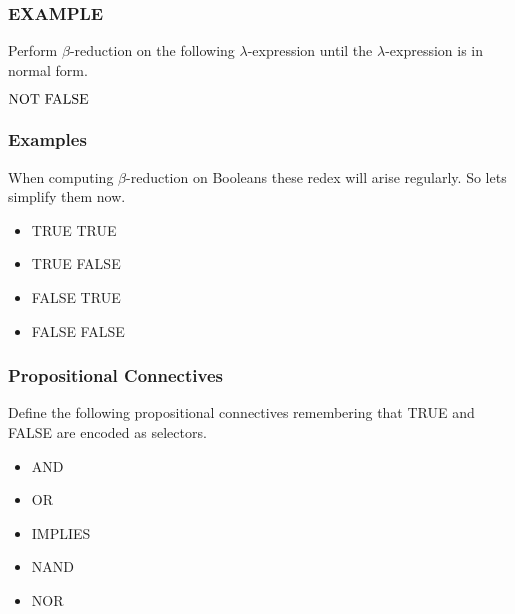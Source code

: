 \documentclass{beamer}
\begin{document}
\begin{frame}
	\frametitle{EXAMPLE}

	Perform $\beta$-reduction on the following $\lambda$-expression until the $\lambda$-expression is in normal form.
	
	\vspace{0.5cm}

	$\text{NOT} \ \text{FALSE}$

	\vspace{5cm}

\end{frame}

\begin{frame}
	\frametitle{Examples}

	When computing $\beta$-reduction on Booleans these redex will arise regularly. So lets simplify them now.

	\begin{itemize}
		\item[] TRUE TRUE \vspace{1cm}
		\item[] TRUE FALSE \vspace{1cm}
		\item[] FALSE TRUE \vspace{1cm}
		\item[] FALSE FALSE \vspace{1cm} 
	\end{itemize}
	
\end{frame}

\begin{frame}
	\frametitle{Propositional Connectives}

	Define the following propositional connectives remembering that TRUE and FALSE are encoded as selectors.

	\vspace{0.3cm}

	\begin{itemize}
		\item[] AND 
		\item[] OR 
		\item[] IMPLIES
		\item[] NAND 
		\item[] NOR
	\end{itemize}

	\vspace{2cm}

\end{frame}
\end{document}
